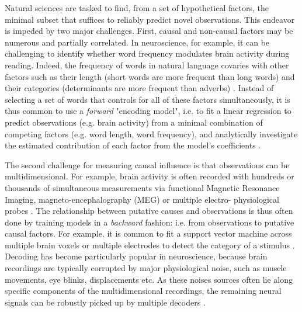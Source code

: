 Natural sciences are tasked to find, from a set of hypothetical factors, the
minimal subset that suffices to reliably predict novel observations. This
endeavor is impeded by two major challenges. First, causal and non-causal
factors may be numerous and partially correlated.
In neuroscience, for
example, it can be challenging to identify whether word frequency modulates
brain activity during reading. Indeed, the
frequency of words in natural language covaries with other factors such as their
length (short words are more frequent than long words) and their categories
(determinants are more frequent than adverbs)
\citep{kutas2011thirty,pegado2014timing}. Instead of selecting a set of words
that controls for all of these factors simultaneously, it is thus common to use
a \emph{forward} "encoding model", i.e. to fit a linear regression to predict observations
(e.g. brain activity) from a minimal combination of competing factors (e.g.
word length, word frequency), and analytically investigate
the estimated contribution of each factor from the model's coefficients
\citep{friston1994statistical,naselaris2011encoding,weichwald2015causal,
king2018encoding,huth2016natural}.

The second challenge for measuring causal influence is that observations can be
multidimensional.
For example, brain activity is often
recorded with hundreds or thousands of simultaneous measurements via functional
Magnetic Resonance Imaging, magneto-encephalography (MEG) or multiple electro-
physiological probes \citep{friston1994statistical,steinmetz2018challenges}.
The relationship between putative causes and observations is thus often
done by training models in a \emph{backward}
fashion: i.e. from observations to putative causal factors. For example, it is
common to fit a support vector machine across multiple
brain voxels or multiple electrodes to detect the
category of a stimulus \citep{norman2006beyond,cichy2014resolving,
kriegeskorte2008representational, king2018encoding}. Decoding has become
particularly popular in neuroscience, because brain recordings are typically
corrupted by major physiological noise, such as muscle movements, eye blinks,
displacements etc. As these noises sources often lie along specific
components of the multidimensional recordings, the remaining neural signals can
be robustly picked up by multiple decoders \citep{king2018encoding}.

